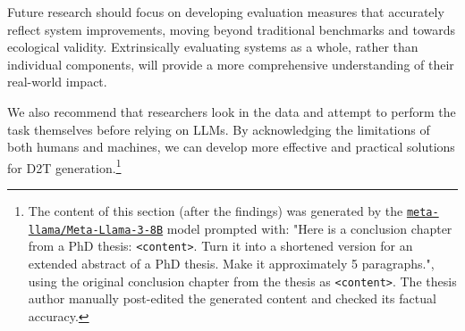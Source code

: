 \documentclass[12pt,notitlepage,a4paper,oneside,openany]{report}
\begin{document}
Future research should focus on developing evaluation measures that accurately reflect system improvements, moving beyond traditional benchmarks and towards ecological validity. Extrinsically evaluating systems as a whole, rather than individual components, will provide a more comprehensive understanding of their real-world impact.

We also recommend that researchers look in the data and attempt to perform the task themselves before relying on LLMs. By acknowledging the limitations of both humans and machines, we can develop more effective and practical solutions for D2T generation.\footnote{The content of this section (after the findings) was generated by the \href{https://huggingface.co/meta-llama/Meta-Llama-3-8B}{\texttt{meta-llama/Meta-Llama-3-8B}} model prompted with: "Here is a conclusion chapter from a PhD thesis: \texttt{<content>}. Turn it into a shortened version for an extended abstract of a PhD thesis. Make it approximately 5 paragraphs.", using the original conclusion chapter from the thesis as \texttt{<content>}. The thesis author manually post-edited the generated content and checked its factual accuracy.}






{\small }


\end{document}
